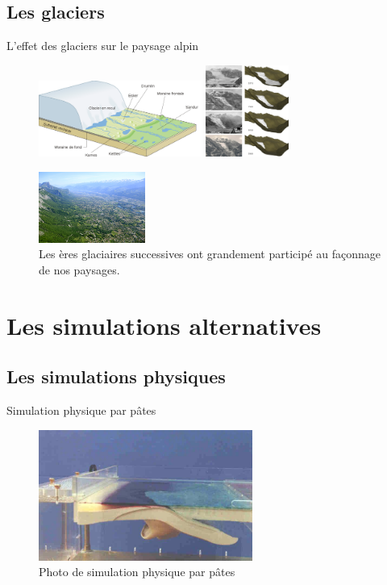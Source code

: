 \documentclass{beamer}
\begin{document}
\subsection{Les glaciers}
\begin{frame}{L'effet des glaciers sur le paysage alpin}
  \begin{center}
    \begin{figure}
      \includegraphics[height=2.5cm]{Images/Images_Alexis/glacier_reculon.png}
      \includegraphics[height=3cm]{Images/Images_Alexis/glaciers_img3.png}
      \caption{Les ères glaciaires successives ont grandement participé au façonnage de nos paysages.}
      \includegraphics[width=3.5cm]{Images/Images_Alexis/gresivaudan.jpg}
    \end{figure}
  \end{center}
\end{frame}

\section{Les simulations alternatives}
\subsection{Les simulations physiques}
\begin{frame}{Simulation physique par pâtes}
  \begin{center}
    \begin{figure}
      \includegraphics[width=7cm]{Images/simulation_physique.png}
      \caption{Photo de simulation physique par pâtes}
    \end{figure}
  \end{center}
\end{frame}
\end{document}
